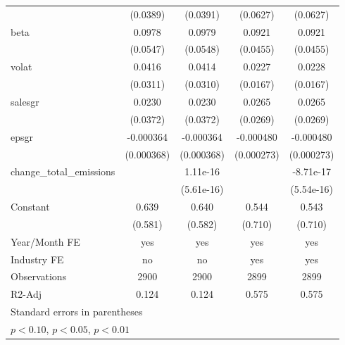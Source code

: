 \begin{table}[htbp]
\begin{tabular}{l*{4}{c}}
                    &    (0.0389)         &    (0.0391)         &    (0.0627)         &    (0.0627)         \\
[1em]
beta                &      0.0978\sym{*}  &      0.0979\sym{*}  &      0.0921\sym{**} &      0.0921\sym{**} \\
                    &    (0.0547)         &    (0.0548)         &    (0.0455)         &    (0.0455)         \\
[1em]
volat               &      0.0416         &      0.0414         &      0.0227         &      0.0228         \\
                    &    (0.0311)         &    (0.0310)         &    (0.0167)         &    (0.0167)         \\
[1em]
salesgr             &      0.0230         &      0.0230         &      0.0265         &      0.0265         \\
                    &    (0.0372)         &    (0.0372)         &    (0.0269)         &    (0.0269)         \\
[1em]
epsgr               &   -0.000364         &   -0.000364         &   -0.000480\sym{*}  &   -0.000480\sym{*}  \\
                    &  (0.000368)         &  (0.000368)         &  (0.000273)         &  (0.000273)         \\
[1em]
change\_total\_emissions&                     &    1.11e-16         &                     &   -8.71e-17         \\
                    &                     &  (5.61e-16)         &                     &  (5.54e-16)         \\
[1em]
Constant            &       0.639         &       0.640         &       0.544         &       0.543         \\
                    &     (0.581)         &     (0.582)         &     (0.710)         &     (0.710)         \\
\hline
Year/Month FE       &         yes         &         yes         &         yes         &         yes         \\
Industry FE         &          no         &          no         &         yes         &         yes         \\
Observations        &        2900         &        2900         &        2899         &        2899         \\
R2-Adj              &       0.124         &       0.124         &       0.575         &       0.575         \\
\hline\hline
\multicolumn{5}{l}{\footnotesize Standard errors in parentheses}\\
\multicolumn{5}{l}{\footnotesize \sym{*} \(p<0.10\), \sym{**} \(p<0.05\), \sym{***} \(p<0.01\)}\\
\end{tabular}
\end{table}
